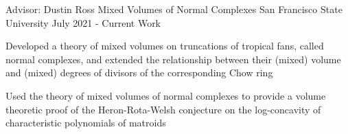 \documentclass[../omelveny-cv]{subfiles}
\begin{document}

\begin{cventries}

    \cventry
    {Advisor: Dustin Ross} %
    {Mixed Volumes of Normal Complexes} %
    {San Francisco State University} %
    {July 2021 - Current Work} %
    {
        \begin{cvitems} %
            \item {Developed a theory of mixed volumes on truncations of tropical fans, called normal complexes, and extended the relationship between their (mixed) volume and (mixed) degrees of divisors of the corresponding Chow ring}
            \item {Used the theory of mixed volumes of normal complexes to provide a volume theoretic proof of the Heron-Rota-Welsh conjecture on the log-concavity of characteristic polynomials of matroids}
        \end{cvitems}
    }

\end{cventries}
\end{document}
